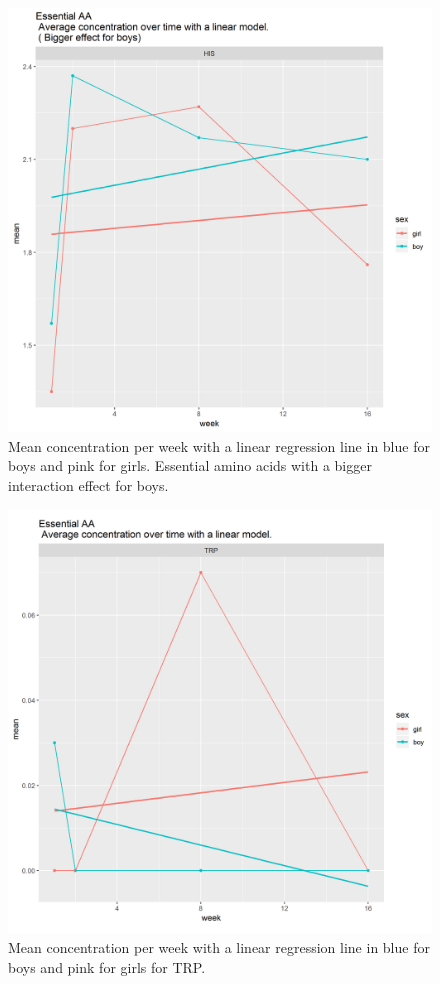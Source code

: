 \documentclass[12pt]{article}
\begin{document}
\begin{figure}[H]
  \centering
  \includegraphics[width=\textwidth]{../sexweek/EAA_boys.png}
  \caption{Mean concentration per week with a linear regression line in blue for boys and pink for girls. Essential amino acids with a bigger interaction effect for boys.}
  \label{fig:EAA_boys}
\end{figure}

\begin{figure}[H]
  \centering
  \includegraphics[width=\textwidth]{../sexweek/EAA_TRP.png}
  \caption{Mean concentration per week with a linear regression line in blue for boys and pink for girls for TRP.}
  \label{fig:EAA_TRP}
\end{figure}
\end{document}
